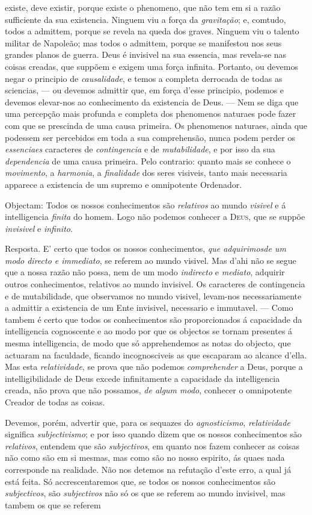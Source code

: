 existe, deve existir, porque existe o phenomeno, que não tem em si a razão sufficiente da sua existencia. Ninguem viu a força da \emph{gravitação}; e, comtudo, todos a admittem, porque se revela na queda dos graves. Ninguem viu o talento militar de Napoleão; mas todos o admittem, porque se manifestou nos seus grandes planos de guerra. Deus é invisivel na sua essencia, mas revela-se nas coisas creadas, que suppõem e exigem uma força infinita. Portanto, ou devemos negar o principio de \emph{causalidade}, e temos a completa derrocada de todas as sciencias, --- ou devemos admittir que, em força d'esse principio, podemos e devemos elevar-nos ao conhecimento da existencia de Deus. --- Nem se diga que uma percepção mais profunda e completa dos phenomenos naturaes pode fazer com que se prescinda de uma causa primeira. Os phenomenos naturaes, ainda que podessem ser percebidos em toda a sua comprehensão, nunca podem perder os \emph{essenciaes} caracteres de \emph{contingencia} e de \emph{mutabilidade}, e por isso da sua \emph{dependencia} de uma causa primeira. Pelo contrario: quanto mais se conhece o \emph{movimento}, a \emph{harmonia}, a \emph{finalidade} dos seres visiveis, tanto mais necessaria apparece a existencia de um supremo e omnipotente Ordenador.\par Objectam: Todos os nossos conhecimentos são \emph{relativos} ao mundo \emph{visivel} e á intelligencia \emph{finita} do homem. Logo não podemos conhecer a \textsc{Deus}, que se suppõe \emph{invisivel} e \emph{infinito}.\par Resposta. E' certo que todos os nossos conhecimentos, \emph{que adquirimos}\emph{de um modo directo e immediato}, se referem ao mundo visivel. Mas d'ahi não se segue que a nossa razão não possa, nem de um modo \emph{indirecto} e \emph{mediato}, adquirir outros conhecimentos, relativos ao mundo invisivel. Os caracteres de contingencia e de mutabilidade, que observamos no mundo visivel, levam-nos necessariamente a admittir a existencia de um Ente invisivel, necessario e immutavel. --- Como tambem é certo que todos os conhecimentos são proporcionados á capacidade da intelligencia cognoscente e ao modo por que os objectos se tornam presentes á mesma intelligencia, de modo que só apprehendemos as notas do objecto, que actuaram na faculdade, ficando incognosciveis as que escaparam ao alcance d'ella. Mas esta \emph{relatividade}, se prova que não podemos \emph{comprehender} a Deus, porque a intelligibilidade de Deus excede infinitamente a capacidade da intelligencia creada, não prova que não possamos, \emph{de algum modo}, conhecer o omnipotente Creador de todas as coisas.\par Devemos, porém, advertir que, para os sequazes do \emph{agnosticismo}, \emph{relatividade} significa \emph{subjectivismo}; e por isso quando dizem que os nossos conhecimentos são \emph{relativos}, entendem que são \emph{subjectivos}, em quanto nos fazem conhecer as coisas não como são em si mesmas, mas como são no nosso espirito, ás quaes nada corresponde na realidade. Não nos detemos na refutação d'este erro, a qual já está feita. Só accrescentaremos que, se todos os nossos conhecimentos são \emph{subjectivos}, são \emph{subjectivos} não só os que se referem ao mundo invisivel, mas tambem os que se referem 
